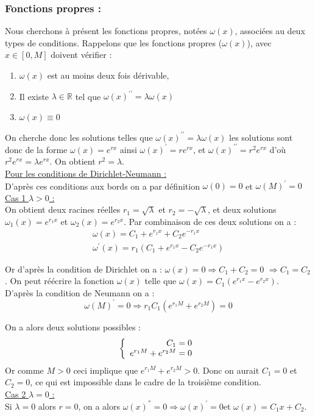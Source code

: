 \documentclass[fleqn,10pt]{SelfArx}
\begin{document}
\subsubsection*{Fonctions propres :}
Nous cherchons à présent les fonctions propres, notées $\omega(x)$, associées au deux types de conditions.
Rappelons que les fonctions propres ($\omega(x)$), avec $x\in [0,M]$ doivent vérifier :
\begin{enumerate}
\item $\omega(x)$ est au moins deux fois dérivable,
\item Il existe $\lambda \in \mathbb{R}$ tel que $\omega(x)^{\prime \prime}=\lambda\omega(x)$
\item $\omega(x) \equiv 0$ \label{cond2}
\end{enumerate}
On cherche donc les solutions telles que $\omega(x)^{\prime \prime}=\lambda\omega(x)$ les solutions sont donc de la forme $\omega(x) = e^{rx}$ ainsi $\omega(x)^{\prime}=re^{rx}$, et $\omega(x)^{\prime \prime}=r^2e^{rx}$ d'où $r^2e^{rx}= \lambda e^{rx}$. On obtient $r^2=\lambda$.\\
\underline{Pour les conditions de Dirichlet-Neumann :}\\
D'après ces conditions aux bords on a par définition $\omega(0)=0$ et $\omega(M)^\prime =0$\\
\underline{Cas 1  $\lambda > 0$ :}\\
On obtient deux racines réelles $r_1 = \sqrt{\lambda}$ et  $r_2 = -\sqrt{\lambda}$, et deux solutions $\omega_1(x)= e^{r_1x}$ et $\omega_2(x)= e^{r_2x}$. Par combinaison de ces deux solutions on a :
\begin{align*}
\omega(x) =C_1+ e^{r_1x}+ C_2e^{-r_1x} \\
\omega^\prime(x) = r_1(C_1 + e^{r_1x} - C_2e^{-r_1x})
\end{align*}

Or d'après la condition de Dirichlet on a :
$\omega(x)=0 \Rightarrow C_1 + C_2=0 $ $ \Rightarrow C_1 =C_2$. On peut réécrire la fonction $\omega(x)$ telle que $\omega(x)= C_1(e^{r_1x}- e^{r_2x })$.\\
D'après la condition de Neumann on a :
$$\omega(M)^\prime = 0  \Rightarrow r_1C_1(e^{r_1M}+e^{r_2M}) =0 $$

On a alors deux solutions possibles :
\[
\left\{
\begin{array}{r c l}
C_1 =0\\
e^{r_1M} + e^{r_2M} =0
\end{array}
\right.
\]
Or comme $M>0$ ceci implique que $e^{r_1M} + e^{r_2M} >0$. Donc on aurait $C_1=0$ et $C_2 =0$, ce qui est impossible dans le cadre de la troisième condition.\\
\underline{Cas 2  $\lambda = 0$ :}\\
Si $\lambda = 0$ alors $r=0$, on a alors $\omega(x)^{''}=0\Rightarrow \omega(x)^{'}=0$et $\omega(x)=C_1x+C_2 $.
\end{document}
